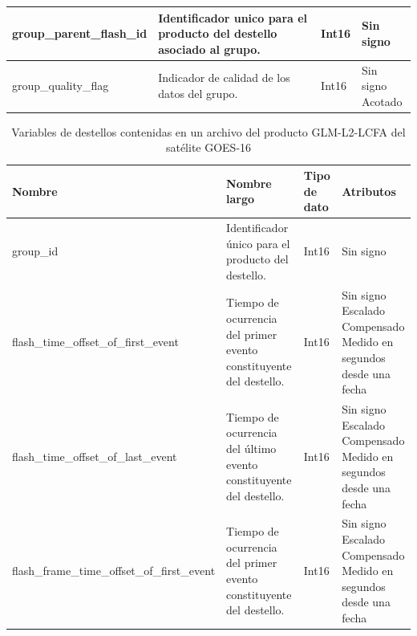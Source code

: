 \begin{table}[H]
\begin{tabular}{l|p{3cm}|p{1.15cm}|p{3.5cm}}
    group\_parent\_flash\_id &
    Identificador unico para el producto del destello asociado al grupo.&
    Int16 &
    \parbox[t]{3.5cm}{Sin signo}\\ \hline

    group\_quality\_flag &
    Indicador de calidad de los datos del grupo.&
    Int16 &
    \parbox[t]{3.5cm}{Sin signo \\ Acotado}\\ 

  \end{tabular}
\end{table}

\begin{table}[H]
  \centering
  \small
  \label{tab:vars_flash_glm}
  \caption{
    Variables de destellos contenidas en un archivo del producto GLM-L2-LCFA del 
    satélite GOES-16
  }
  \begin{tabular}{l|p{3cm}|p{1.15cm}|p{3.5cm}}
    \textbf{Nombre} & 
    \textbf{Nombre largo} & 
    \textbf{Tipo de dato} & 
    \textbf{Atributos} \\ \hline

    group\_id &
    Identificador único para el producto del destello.&
    Int16 &
    \parbox[t]{3.5cm}{Sin signo}\\ \hline

    flash\_time\_offset\_of\_first\_event &
    Tiempo de ocurrencia del primer evento constituyente del destello. &
    Int16 &
    \parbox[t]{3.5cm}{Sin signo \\ Escalado \\ Compensado \\ Medido en segundos desde una fecha}\\ \hline

    flash\_time\_offset\_of\_last\_event &
    Tiempo de ocurrencia del último evento constituyente del destello. &
    Int16 &
    \parbox[t]{3.5cm}{Sin signo \\ Escalado \\ Compensado \\ Medido en segundos desde una fecha}\\ \hline

    flash\_frame\_time\_offset\_of\_first\_event &
    Tiempo de ocurrencia del primer evento constituyente del destello. &
    Int16 &
    \parbox[t]{3.5cm}{Sin signo \\ Escalado \\ Compensado \\ Medido en segundos desde una fecha}\\ \hline


\end{tabular}
\end{table}
